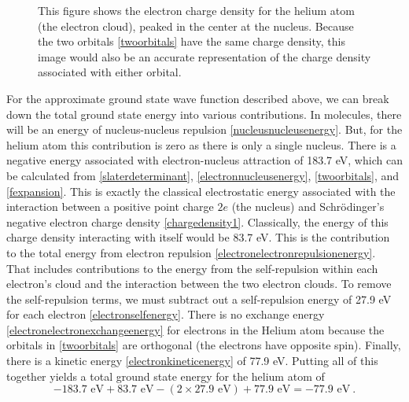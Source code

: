 \documentclass[onecolumn,secnumarabic,amsmath,amssymb,balancelastpage,nofootinbib]{article}
\begin{document}
\begin{figure}[htb]
\caption{This figure shows the electron charge density for the helium atom (the electron cloud), peaked in the center at the nucleus.  Because the two orbitals \eqref{twoorbitals} have the same charge density, this image would also be an accurate representation of the charge density associated with either orbital.}
\label{helium}
\end{figure}

For the approximate ground state wave function described above, we can break down the total ground state energy into various contributions.  In molecules, there will be an energy of nucleus-nucleus repulsion \eqref{nucleusnucleusenergy}.  But, for the helium atom this contribution is zero as there is only a single nucleus.  There is a negative energy associated with electron-nucleus attraction of 183.7 eV, which can be calculated from \eqref{slaterdeterminant}, \eqref{electronnucleusenergy}, \eqref{twoorbitals}, and \eqref{fexpansion}.  This is exactly the classical electrostatic energy associated with the interaction between a positive point charge $2e$ (the nucleus) and Schr\"{o}dinger's negative electron charge density \eqref{chargedensity1}.  Classically, the energy of this charge density interacting with itself would be 83.7 eV.  This is the contribution to the total energy from electron repulsion \eqref{electronelectronrepulsionenergy}.  That includes contributions to the energy from the self-repulsion within each electron's cloud and the interaction between the two electron clouds.  To remove the self-repulsion terms, we must subtract out a self-repulsion energy of 27.9 eV for each electron \eqref{electronselfenergy}.  There is no exchange energy \eqref{electronelectronexchangeenergy} for electrons in the Helium atom because the orbitals in \eqref{twoorbitals} are orthogonal (the electrons have opposite spin).  Finally, there is a kinetic energy \eqref{electronkineticenergy} of 77.9 eV.  Putting all of this together yields a total ground state energy for the helium atom of
\begin{equation}
-183.7\mbox{ eV}+83.7\mbox{ eV}-(2 \times 27.9\mbox{ eV})+77.9\mbox{ eV}=-77.9\mbox{ eV}
\ .
\end{equation}
\end{document}
